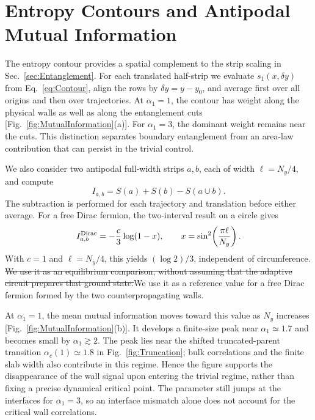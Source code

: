 \documentclass[aps,prb,10pt,twocolumn,superscriptaddress,longbibliography,floatfix]{revtex4-2}
\newcommand{\claudeadd}[1]{{\color{orange}#1}}
\newcommand{\claudedel}[1]{{\color{orange}\sout{#1}}}
\begin{document}
{\color{blue}
\section{Entropy Contours and Antipodal Mutual Information}
\label{app:MutualInformation}

The entropy contour provides a spatial complement to the strip scaling in Sec.~\ref{sec:Entanglement}. For each translated half-strip we evaluate $s_1(x,\delta y)$ from Eq.~\eqref{eq:Contour}, align the rows by $\delta y=y-y_0$, and average first over all origins and then over trajectories. At $\alpha_1=1$, the contour has weight along the physical walls as well as along the entanglement cuts [Fig.~\ref{fig:MutualInformation}(a)]. For $\alpha_1=3$, the dominant weight remains near the cuts. This distinction separates boundary entanglement from an area-law contribution that can persist in the trivial control.

We also consider two antipodal full-width strips $a,b$, each of width $\ell=N_y/4$, and compute
\begin{equation}
 I_{a,b}=S(a)+S(b)-S(a\cup b).
 \label{eq:MutualInformation}
\end{equation}
The subtraction is performed for each trajectory and translation before either average. For a free Dirac fermion, the two-interval result on a circle gives~\cite{CasiniHuerta2009,CalabreseCardyTonni2009}
\begin{equation}
 I^{\rm Dirac}_{a,b}=-\frac{c}{3}\log(1-x),\qquad
 x=\sin^2\!\left(\frac{\pi\ell}{N_y}\right).
 \label{eq:DiracMI}
\end{equation}
With $c=1$ and $\ell=N_y/4$, this yields $(\log2)/3$, independent of circumference. \claudedel{We use it as an equilibrium comparison, without assuming that the adaptive circuit prepares that ground state.}\claudeadd{We use it as a reference value for a free Dirac fermion formed by the two counterpropagating walls.}

At $\alpha_1=1$, the mean mutual information moves toward this value as $N_y$ increases [Fig.~\ref{fig:MutualInformation}(b)]. It develops a finite-size peak near $\alpha_1\simeq1.7$ and becomes small by $\alpha_1\gtrsim2$. The peak lies near the shifted truncated-parent transition $\alpha_c(1)\simeq1.8$ in Fig.~\ref{fig:Truncation}; bulk correlations and the finite slab width also contribute in this regime. Hence the figure supports the disappearance of the wall signal upon entering the trivial regime, rather than fixing a precise dynamical critical point. The parameter still jumps at the interfaces for $\alpha_1=3$, so an interface mismatch alone does not account for the critical wall correlations.
}
\end{document}
